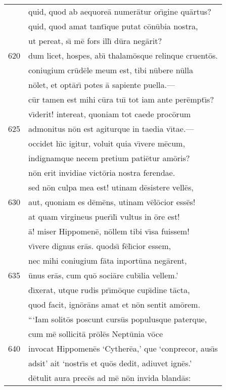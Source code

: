 \documentclass[paper=6in:9in,pagesize=pdftex,
               headinclude=on,footinclude=on,12pt]{scrbook}
\begin{document}
\begin{longtable}[p]{ r l }
 & quid, quod ab aequore\=a numer\=atur or\={\i}gine qu\=artus?\\ 
 & quid, quod amat tant\={\i}que putat c\=on\=ubia nostra,\\ 
 & ut pereat, s\={\i} m\=e fors ill\={\i} d\=ura neg\=arit?\\ 
620 & dum licet, hospes, ab\={\i} thalam\=osque relinque cruent\=os.\\ 
 & coniugium cr\=ud\=ele meum est, tibi n\=ubere n\=ulla\\ 
 & n\=olet, et opt\=ar\={\i} potes \=a sapiente puella.—\\ 
 & c\=ur tamen est mihi c\=ura tu\={\i} tot iam ante per\=empt\={\i}s?\\ 
 & v\={\i}derit! intereat, quoniam tot caede proc\=orum\\ 
625 & admonitus n\=on est agiturque in taedia v\={\i}tae.—\\ 
 & occidet h\={\i}c igitur, voluit quia v\={\i}vere m\=ecum,\\ 
 & indignamque necem pretium pati\=etur am\=oris?\\ 
 & n\=on erit invidiae vict\=oria nostra ferendae.\\ 
 & sed n\=on culpa mea est! utinam d\=esistere vell\=es,\\ 
630 & aut, quoniam es d\=em\=ens, utinam v\=el\=ocior ess\=es!\\ 
 & at quam virgineus puer\={\i}l\={\i} vultus in \=ore est!\\ 
 & \=a! miser Hippomen\=e, n\=ollem tibi v\={\i}sa fuissem!\\ 
 & v\={\i}vere dignus er\=as. quods\={\i} f\=el\={\i}cior essem,\\ 
 & nec mihi coniugium f\=ata inport\=una neg\=arent,\\ 
635 & \=unus er\=as, cum qu\=o soci\=are cub\={\i}lia vellem.'\\ 
 & d\={\i}xerat, utque rudis pr\={\i}m\=oque cup\={\i}dine t\=acta,\\ 
 & quod facit, ign\=or\=ans amat et n\=on sentit am\=orem.\\ 
 & \indent ```Iam solit\=os poscunt curs\=us populusque paterque,\\ 
 & cum m\=e sollicit\=a pr\=ol\=es Nept\=unia v\=oce\\ 
640 & invocat Hippomen\=es `Cyther\=ea,' que `conprecor, aus\={\i}s\\ 
 & adsit' ait `nostr\={\i}s et qu\=os dedit, adiuvet ign\=es.'\\ 
 & d\=etulit aura prec\=es ad m\=e n\=on invida bland\=as:\\ 

\end{longtable}
\end{document}
